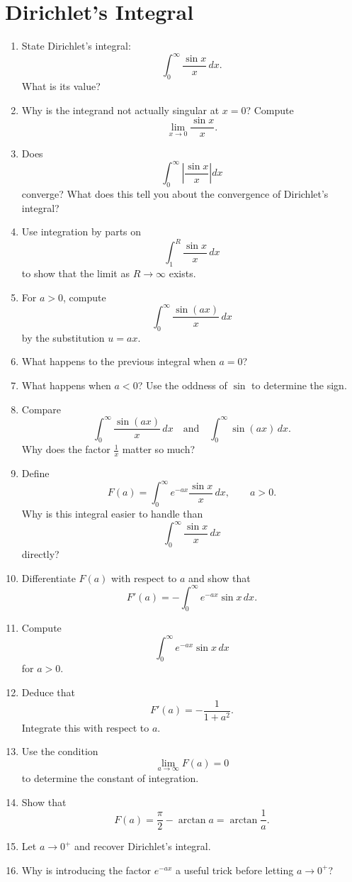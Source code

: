 \section{Dirichlet's Integral}

\begin{enumerate}


  \item State Dirichlet's integral:
    \[
      \int_0^\infty \frac{\sin x}{x}\,dx.
    \]
    What is its value?
  \item Why is the integrand not actually singular at $x=0$? Compute
    \[
      \lim_{x\to 0} \frac{\sin x}{x}.
    \]
  \item Does
    \[
      \int_0^\infty \left|\frac{\sin x}{x}\right|dx
    \]
    converge? What does this tell you about the convergence of Dirichlet's integral?
  \item Use integration by parts on
    \[
      \int_1^R \frac{\sin x}{x}\,dx
    \]
    to show that the limit as $R\to\infty$ exists.


  \item For $a>0$, compute
    \[
      \int_0^\infty \frac{\sin(ax)}{x}\,dx
    \]
    by the substitution $u=ax$.
  \item What happens to the previous integral when $a=0$?
  \item What happens when $a<0$? Use the oddness of $\sin$ to determine the sign.
  \item Compare
    \[
      \int_0^\infty \frac{\sin(ax)}{x}\,dx
      \quad\text{and}\quad
      \int_0^\infty \sin(ax)\,dx.
    \]
    Why does the factor $\tfrac1x$ matter so much?


  \item Define
    \[
      F(a)=\int_0^\infty e^{-ax}\frac{\sin x}{x}\,dx,
      \qquad a>0.
    \]
    Why is this integral easier to handle than
    \[
      \int_0^\infty \frac{\sin x}{x}\,dx
    \]
    directly?
  \item Differentiate $F(a)$ with respect to $a$ and show that
    \[
      F'(a)=-\int_0^\infty e^{-ax}\sin x\,dx.
    \]
  \item Compute
    \[
      \int_0^\infty e^{-ax}\sin x\,dx
    \]
    for $a>0$.
  \item Deduce that
    \[
      F'(a)=-\frac{1}{1+a^2}.
    \]
    Integrate this with respect to $a$.
  \item Use the condition
    \[
      \lim_{a\to\infty} F(a)=0
    \]
    to determine the constant of integration.
  \item Show that
    \[
      F(a)=\frac{\pi}{2}-\arctan a=\arctan\frac{1}{a}.
    \]
  \item Let $a\to 0^+$ and recover Dirichlet's integral.
  \item Why is introducing the factor $e^{-ax}$ a useful trick before letting $a\to 0^+$?


\end{enumerate}

